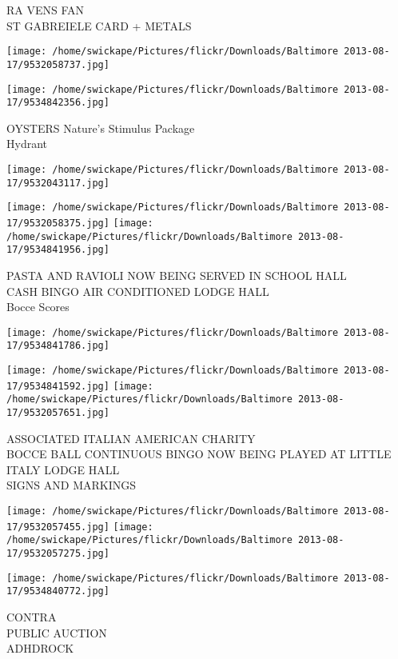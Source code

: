 \documentclass[10pt,letterpaper]{article}
\begin{document}
RA VENS FAN\\
ST GABREIELE CARD + METALS
\pagebreak

\texttt{[image: /home/swickape/Pictures/flickr/Downloads/Baltimore 2013-08-17/9532058737.jpg]}

\vspace{0.25in}
\texttt{[image: /home/swickape/Pictures/flickr/Downloads/Baltimore 2013-08-17/9534842356.jpg]}

OYSTERS Nature's Stimulus Package\\
Hydrant
\pagebreak

\texttt{[image: /home/swickape/Pictures/flickr/Downloads/Baltimore 2013-08-17/9532043117.jpg]}

\vspace{0.25in}
\texttt{[image: /home/swickape/Pictures/flickr/Downloads/Baltimore 2013-08-17/9532058375.jpg]}
\texttt{[image: /home/swickape/Pictures/flickr/Downloads/Baltimore 2013-08-17/9534841956.jpg]}

PASTA AND RAVIOLI NOW BEING SERVED IN SCHOOL HALL\\
CASH BINGO AIR CONDITIONED LODGE HALL\\
Bocce Scores
\pagebreak

\texttt{[image: /home/swickape/Pictures/flickr/Downloads/Baltimore 2013-08-17/9534841786.jpg]}

\vspace{0.25in}
\texttt{[image: /home/swickape/Pictures/flickr/Downloads/Baltimore 2013-08-17/9534841592.jpg]}
\texttt{[image: /home/swickape/Pictures/flickr/Downloads/Baltimore 2013-08-17/9532057651.jpg]}

ASSOCIATED ITALIAN AMERICAN CHARITY\\
BOCCE BALL CONTINUOUS BINGO NOW BEING PLAYED AT LITTLE ITALY LODGE HALL\\
SIGNS AND MARKINGS
\pagebreak

\texttt{[image: /home/swickape/Pictures/flickr/Downloads/Baltimore 2013-08-17/9532057455.jpg]}
\texttt{[image: /home/swickape/Pictures/flickr/Downloads/Baltimore 2013-08-17/9532057275.jpg]}

\texttt{[image: /home/swickape/Pictures/flickr/Downloads/Baltimore 2013-08-17/9534840772.jpg]}

CONTRA\\
PUBLIC AUCTION\\
ADHDROCK
\pagebreak
\end{document}
